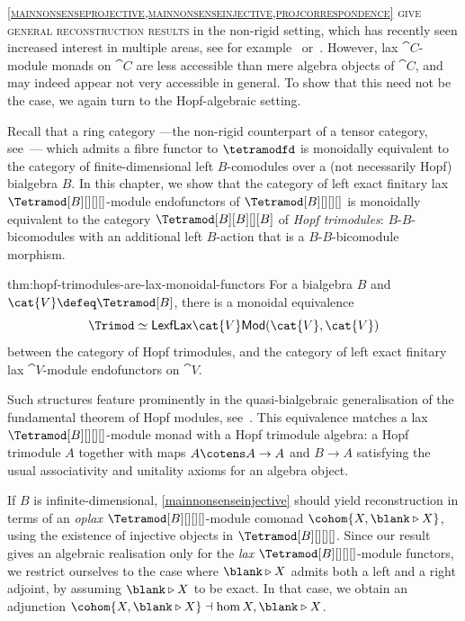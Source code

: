 \textsc{\cref{mainnonsenseprojective,mainnonsenseinjective,projcorrespondence} give general reconstruction results}
in the non-rigid setting,
which has recently seen increased interest in multiple areas,
see for example~\cite{douglas19,allen21:dualit-feigin-fuchs} or~\cite[Corollary~10.11]{stroinski24:modul-tambar}.
However, lax \(\cat{C}\)\hyp{}module monads on \(\cat{C}\) are less accessible than mere algebra objects of \(\cat{C}\),
and may indeed appear not very accessible in general.
To show that this need not be the case, we again turn to the Hopf-algebraic setting.

Recall that a ring category%
—the non-rigid counterpart of a tensor category, see~\cite[Sections~4.2 and~5.4]{Etingof2015}—%
which admits a fibre functor to \(\tetramodfd\) is monoidally equivalent to the category
of finite-dimensional left \(B\)\hyp{}comodules over a (not necessarily Hopf) bialgebra \(B\).
In this chapter, we show that the category of left exact finitary lax \(\Tetramod[B][][][]\)\hyp{}module endofunctors of \(\Tetramod[B][][][]\)
is monoidally equivalent to the category \(\Tetramod[B][B][][B]\) of \emph{Hopf trimodules}:
\(B\)\hyp{}\(B\)\hyp{}bi\-co\-mo\-dules
with an additional left \(B\)\hyp{}action
that is a \(B\)\hyp{}\(B\)\hyp{}bicomodule morphism.

\begin{reptheorem}{thm:hopf-trimodules-are-lax-monoidal-functors}
  For a bialgebra \(B\) and \(\cat{V} \defeq \Tetramod[B]\),
  there is a monoidal equivalence
  \[
    \Trimod \simeq \mathsf{LexfLax}\cat{V}\mathsf{Mod}(\cat{V}, \cat{V})
  \]
  between the category of Hopf trimodules, and
  the category of left exact finitary lax \(\cat{V}\)\hyp{}module endofunctors on \(\cat{V}\).
\end{reptheorem}

Such structures feature prominently in the quasi-bialgebraic generalisation of the fundamental theorem of Hopf modules,
see~\cite{hausser99:integ-theor-quasi-hopf-algeb,saracco17:hopf}.
This equivalence matches a lax \(\Tetramod[B][][][]\)\hyp{}module monad with a Hopf trimodule algebra:
a Hopf trimodule \(A\) together with maps \(A \cotens A \to A\) and \(B \to A\) satisfying the usual associativity and unitality axioms for an algebra object.

If \(B\) is infinite-dimensional, \cref{mainnonsenseinjective}
should yield reconstruction in terms of an \emph{oplax} \(\Tetramod[B][][][]\)\hyp{}module comonad \(\cohom{X,\blank \triangleright X}\),
using the existence of injective objects in \(\Tetramod[B][][][]\).
Since our result gives an algebraic realisation only for the \emph{lax} \(\Tetramod[B][][][]\)\hyp{}module functors,
we restrict ourselves to the case where \(\blank \triangleright X\) admits both a left and a right adjoint,
by assuming \(\blank \triangleright X\) to be exact.
In that case, we obtain an adjunction \(\cohom{X,\blank \triangleright X} \dashv \hom{X,\blank \triangleright X}\).

